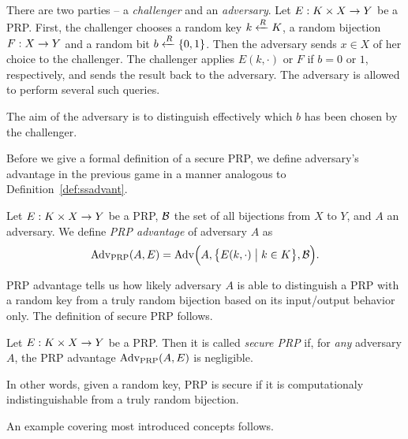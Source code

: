 \begin{game}
\label{game:prp}
	There are two parties -- a {\em challenger} and an {\em adversary}. Let $E:K\times X\rightarrow Y$ be a PRP. First, the challenger chooses a random key $k\xleftarrow{R} K$, a random bijection $F:X\rightarrow Y$ and a random bit $b\xleftarrow{R}\{0,1\}$. Then the adversary sends $x\in X$ of her choice to the challenger. The challenger applies $E(k,\cdot)$ or $F$ if $b=0$ or $1$, respectively, and sends the result back to the adversary. The adversary is allowed to perform several such queries.
	
	The aim of the adversary is to distinguish effectively which $b$ has been chosen by the challenger.
\end{game}

Before we give a formal definition of a secure PRP, we define adversary's advantage in the previous game in a manner analogous to Definition~\ref{def:ssadvant}.

\begin{defn}
\label{def:prpadvant}
	Let $E: K\times X\rightarrow Y$ be a PRP, $\cal B$ the set of all bijections from $X$ to $Y$, and $A$ an adversary. We define {\em PRP advantage} of adversary $A$ as
	\[
		\operatorname*{Adv_{PRP}}(A,E) = \operatorname*{Adv}\Bigl(A,\bigl\{E(k,\cdot) \bigm| k\in K\bigr\},{\cal B}\Bigr) .
	\]
\end{defn}

PRP advantage tells us how likely adversary $A$ is able to distinguish a PRP with a random key from a truly random bijection based on its input/output behavior only. The definition of secure PRP follows.

\begin{defn}
\label{def:secprp}
	Let $E: K\times X\rightarrow Y$ be a PRP. Then it is called {\em secure PRP} if, for {\em any} adversary $A$, the PRP advantage $\operatorname*{Adv_{PRP}}(A,E)$ is negligible.
\end{defn}

In other words, given a random key, PRP is secure if it is computationaly indistinguishable from a truly random bijection. 

An example covering most introduced concepts follows.

